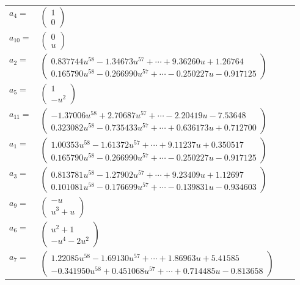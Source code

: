 \documentclass[1p]{elsarticle_modified}
\theoremstyle{definition}
\begin{document}
\begin{tabular}{m{7pt} m{180pt} m{7pt} m{180pt} }
\flushright $a_{4}=$&$\begin{pmatrix}1\\0\end{pmatrix}$ \\
\flushright $a_{10}=$&$\begin{pmatrix}0\\u\end{pmatrix}$ \\
\flushright $a_{2}=$&$\begin{pmatrix}0.837744 u^{58}-1.34673 u^{57}+\cdots+9.36260 u+1.26764\\0.165790 u^{58}-0.266990 u^{57}+\cdots-0.250227 u-0.917125\end{pmatrix}$ \\
\flushright $a_{5}=$&$\begin{pmatrix}1\\- u^2\end{pmatrix}$ \\
\flushright $a_{11}=$&$\begin{pmatrix}-1.37006 u^{58}+2.70687 u^{57}+\cdots-2.20419 u-7.53648\\0.323082 u^{58}-0.735433 u^{57}+\cdots+0.636173 u+0.712700\end{pmatrix}$ \\
\flushright $a_{1}=$&$\begin{pmatrix}1.00353 u^{58}-1.61372 u^{57}+\cdots+9.11237 u+0.350517\\0.165790 u^{58}-0.266990 u^{57}+\cdots-0.250227 u-0.917125\end{pmatrix}$ \\
\flushright $a_{3}=$&$\begin{pmatrix}0.813781 u^{58}-1.27902 u^{57}+\cdots+9.23409 u+1.12697\\0.101081 u^{58}-0.176699 u^{57}+\cdots-0.139831 u-0.934603\end{pmatrix}$ \\
\flushright $a_{9}=$&$\begin{pmatrix}- u\\u^3+u\end{pmatrix}$ \\
\flushright $a_{6}=$&$\begin{pmatrix}u^2+1\\- u^4-2 u^2\end{pmatrix}$ \\
\flushright $a_{7}=$&$\begin{pmatrix}1.22085 u^{58}-1.69130 u^{57}+\cdots+1.86963 u+5.41585\\-0.341950 u^{58}+0.451068 u^{57}+\cdots+0.714485 u-0.813658\end{pmatrix}$ \\

\end{tabular}
\end{document}
